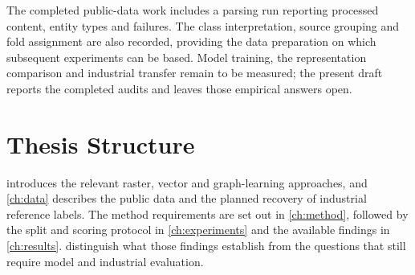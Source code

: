 The completed public-data work includes a parsing run reporting processed content,
entity types and failures.
The class interpretation, source grouping and fold assignment are also recorded,
providing the data preparation on which subsequent experiments can be based.
Model training, the representation comparison and industrial transfer remain to
be measured; the present draft reports the completed audits and leaves those
empirical answers open.

\section{Thesis Structure}
\label{sec:thesis-structure}
 introduces the relevant raster, vector and graph-learning
approaches, and \cref{ch:data} describes the public data and the planned recovery
of industrial reference labels.
The method requirements are set out in \cref{ch:method}, followed by the split and
scoring protocol in \cref{ch:experiments} and the available findings in
\cref{ch:results}.
 distinguish what those findings establish from
the questions that still require model and industrial evaluation.
